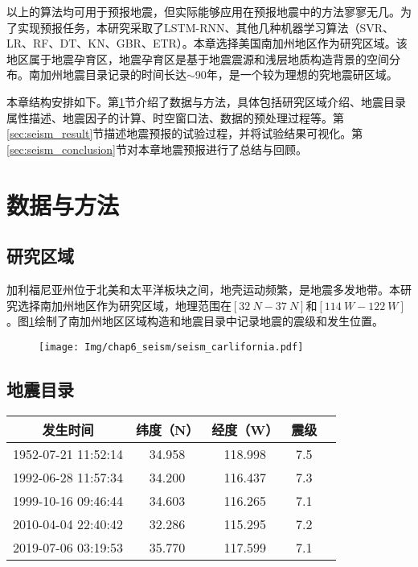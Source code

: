 以上的算法均可用于预报地震，但实际能够应用在预报地震中的方法寥寥无几。为了实现预报任务，本研究采取了LSTM-RNN\citep{Wang2017Earthquake,Bhatia2018EARTHQUAKE,berhich2020lstm}、其他几种机器学习算法（SVR、LR、RF、DT、KN、GBR、ETR）。本章选择美国南加州地区作为研究区域。该地区属于地震孕育区，地震孕育区是基于地震震源和浅层地质构造背景的空间分布。南加州地震目录记录的时间长达$\sim$90年，是一个较为理想的究地震研区域。

本章结构安排如下。第\ref{sec:seism_data_method}节介绍了数据与方法，具体包括研究区域介绍、地震目录属性描述、地震因子的计算、时空窗口法、数据的预处理过程等。第\ref{sec:seism_result}节描述地震预报的试验过程，并将试验结果可视化。第\ref{sec:seism_conclusion}节对本章地震预报进行了总结与回顾。

\section{数据与方法}\label{sec:seism_data_method}

\subsection{研究区域}\label{sec:seism_area}

加利福尼亚州位于北美和太平洋板块之间，地壳运动频繁，是地震多发地带。本研究选择南加州地区作为研究区域，地理范围在$[\SI{32}{N}-\SI{37}{N}]$和$[\SI{114}{W}-\SI{122}{W}]$。图\ref{fig:seism_california}绘制了南加州地区区域构造和地震目录中记录地震的震级和发生位置。

\begin{figure}[!htbp]
  \centering
  \texttt{[image: Img/chap6\_seism/seism\_carlifornia.pdf]}
  \label{fig:seism_california}
\end{figure}

\subsection{地震目录}\label{sec:seism_catolog}

\begin{table}[!htbp]
  \label{tab:seism_magnitude_7}
  \centering
  \footnotesize
  \begin{tabular}{ccccc} 
    \toprule
    发生时间 & 纬度（N） & 经度（W） & 震级 \\
    \midrule
    1952-07-21 11:52:14 & 34.958 & 118.998 & 7.5 \\
    1992-06-28 11:57:34 & 34.200 & 116.437 & 7.3 \\
    1999-10-16 09:46:44 & 34.603 & 116.265 & 7.1 \\
    2010-04-04 22:40:42 & 32.286 & 115.295 & 7.2 \\
    2019-07-06 03:19:53 & 35.770 & 117.599 & 7.1 \\
    \bottomrule
  \end{tabular}
\end{table}


